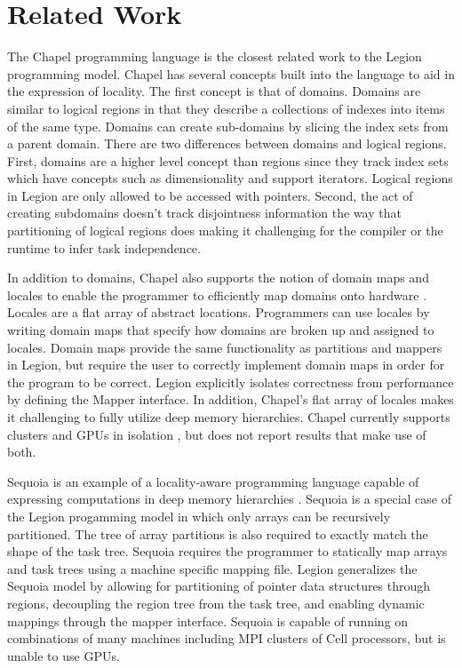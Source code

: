 
\section{Related Work}

The Chapel programming language \cite{Chamberlain:Chapel} is the closest related work to the Legion
programming model.  Chapel has several concepts built into the language to aid in
the expression of locality.  The first concept is that of domains.  Domains
are similar to logical regions in that they describe a collections of indexes
into items of the same type.  Domains can create sub-domains by slicing the index sets from
a parent domain.  There are two differences between domains and logical regions.
First, domains are a higher level concept than regions since they track index sets which
have concepts such as dimensionality and support iterators.  Logical regions in Legion 
are only allowed to be accessed with pointers.  Second, the act of creating
subdomains doesn't track disjointness information the way that partitioning of logical regions
does making it challenging for the compiler or the runtime to infer task independence.

In addition to domains, Chapel also supports the notion of domain maps and locales to enable 
the programmer to efficiently map domains onto hardware \cite{CHAPEL11}.  Locales are a flat array
of abstract locations.  Programmers can use locales by writing domain maps that specify
how domains are broken up and assigned to locales.  Domain maps provide the same functionality
as partitions and mappers in Legion, but require the user to correctly implement domain
maps in order for the program to be correct.  Legion explicitly isolates correctness
from performance by defining the Mapper interface.  In addition, Chapel's flat array of locales
makes it challenging to fully utilize deep memory hierarchies.  Chapel currently supports
clusters and GPUs in isolation \cite{CHAPELGPU}, but does not report results that 
make use of both.

Sequoia is an example of a locality-aware programming language capable of 
expressing computations in deep memory hierarchies \cite{Fatahalian06}.  
Sequoia is a special case
of the Legion progamming model in which only arrays can be recursively partitioned.
The tree of array partitions is also required to exactly match the shape of the task tree.  
Sequoia requires the programmer to statically map arrays and task trees 
using a machine specific mapping file.
Legion generalizes the Sequoia model by allowing for partitioning of pointer data structures through 
regions, decoupling the region tree from the task tree, and enabling dynamic 
mappings through the mapper interface.  Sequoia is capable of running on
combinations of many machines including MPI clusters of Cell processors, but
is unable to use GPUs.

